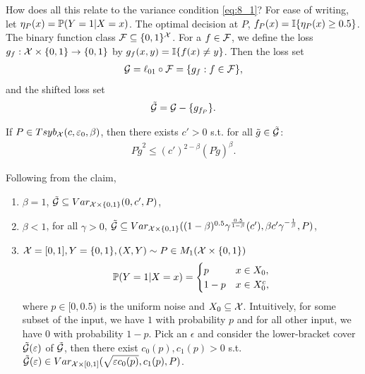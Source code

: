 \documentclass[twoside]{article}
\begin{document}
How does all this relate to the variance condition \cref{eq:8_1}?  For ease of writing, let $\eta_P(x) = \mathbb{P}(Y= 1 | X=x)$.  The optimal decision at $P$, $f_P(x) = \mathbb{I}\{ \eta_P(x) \geq 0.5 \}$.  The binary function class $\mathcal{F} \subseteq \{0, 1\}^{\mathcal{X}}$.  For a $f \in \mathcal{F}$, we define the loss $g_f: \mathcal{X} \times \{0,1\} \to\{ 0, 1\}$ by $g_f(x,y) = \mathbb{I}\{f(x) \neq y\}$.  Then the loss set
\begin{align}
    \mathcal{G} = \ell_{01} \circ \mathcal{F} = \{g_f : f \in \mathcal{F} \},
\end{align}
and the shifted loss set 
\begin{align}
    \tilde {\mathcal{G}} = \mathcal{G} - \{g_{f_P}\}.
\end{align}
\begin{claim}   
    If $P \in Tsyb_{\mathcal{X}}(c, \varepsilon_0, \beta)$, then there exists $c' > 0$ s.t. for all $\tilde g \in \tilde {\mathcal{G}}$:
    \begin{align}
        P \tilde g^2 \leq (c')^{2 - \beta} ( P\tilde g)^{\beta}.
    \end{align}
\end{claim}
Following from the claim,  
\begin{enumerate}
    \item $\beta = 1$, $\tilde {\mathcal{G}} \subseteq Var_{\mathcal{X} \times \{0,1\}}(0, c', P)$, \\
    \item $\beta < 1$, for all $\gamma > 0$,
    $\tilde {\mathcal{G}} \subseteq Var_{\mathcal{X} \times \{0,1\}}((1-\beta)^{0.5} \gamma^{\frac{0.5}{1-\beta}}(c'), \beta c' \gamma^{-\frac{1}{\beta}}, P)$, \\
    \item $\mathcal{X} = [0,1], Y = \{0, 1\}, (X,Y) \sim P \in M_1(\mathcal{X} \times \{0,1\})$ 
    \begin{align}
        \mathbb{P}(Y=1 | X = x) = \begin{cases}
            p & x \in X_0, \\
            1-p & x \in X_0^c,
        \end{cases}
    \end{align}
    where $p \in [0, 0.5)$ is the uniform noise and $X_0 \subseteq \mathcal{X}$.  Intuitively, for some subset of the input, we have $1$ with probability $p$ and for all other input, we have $0$ with probability $1-p$.  Pick an $\epsilon$ and consider the lower-bracket cover $\tilde {\mathcal{G}}(\varepsilon)$ of $\tilde {\mathcal{G}}$, then there exist $c_0(p), c_1(p)> 0$ s.t. $\tilde {\mathcal{G}}(\varepsilon) \in Var_{\mathcal{X} \times [0,1]}( \sqrt{\varepsilon c_0(p)}, c_1(p), P)$.  
\end{enumerate}
\end{document}
